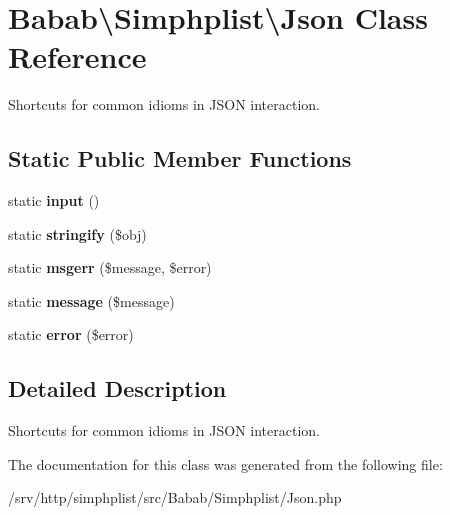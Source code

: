 \hypertarget{classBabab_1_1Simphplist_1_1Json}{\section{Babab\textbackslash{}Simphplist\textbackslash{}Json Class Reference}
\label{classBabab_1_1Simphplist_1_1Json}
}


Shortcuts for common idioms in J\+S\+O\+N interaction.  


\subsection*{Static Public Member Functions}
\begin{DoxyCompactItemize}
\item 
\hypertarget{classBabab_1_1Simphplist_1_1Json_abc4534911058c47e6a30d7e4d9af9316}{static {\bfseries input} ()}\label{classBabab_1_1Simphplist_1_1Json_abc4534911058c47e6a30d7e4d9af9316}

\item 
\hypertarget{classBabab_1_1Simphplist_1_1Json_a1cdabb8681210a5a2d4e53b97e83c54e}{static {\bfseries stringify} (\$obj)}\label{classBabab_1_1Simphplist_1_1Json_a1cdabb8681210a5a2d4e53b97e83c54e}

\item 
\hypertarget{classBabab_1_1Simphplist_1_1Json_a379e8f7929689267630250bb91d623b8}{static {\bfseries msgerr} (\$message, \$error)}\label{classBabab_1_1Simphplist_1_1Json_a379e8f7929689267630250bb91d623b8}

\item 
\hypertarget{classBabab_1_1Simphplist_1_1Json_a1506a7b4889f1af478050c185f1d5cb7}{static {\bfseries message} (\$message)}\label{classBabab_1_1Simphplist_1_1Json_a1506a7b4889f1af478050c185f1d5cb7}

\item 
\hypertarget{classBabab_1_1Simphplist_1_1Json_a5041a7ea62e0420fbe5a35bba3d6d088}{static {\bfseries error} (\$error)}\label{classBabab_1_1Simphplist_1_1Json_a5041a7ea62e0420fbe5a35bba3d6d088}

\end{DoxyCompactItemize}


\subsection{Detailed Description}
Shortcuts for common idioms in J\+S\+O\+N interaction. 

The documentation for this class was generated from the following file\+:\begin{DoxyCompactItemize}
\item 
/srv/http/simphplist/src/\+Babab/\+Simphplist/Json.\+php\end{DoxyCompactItemize}
